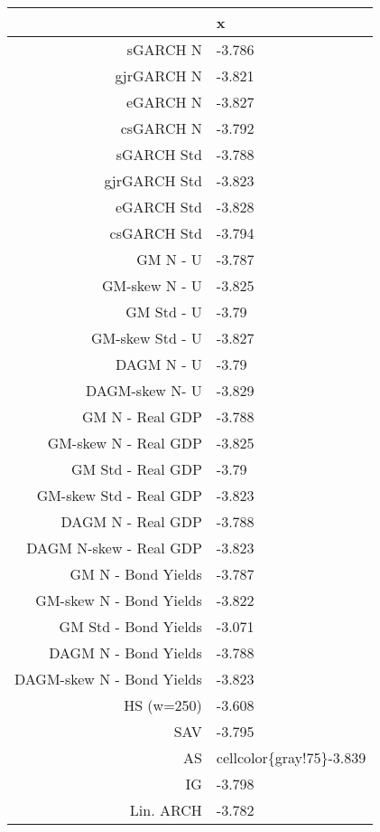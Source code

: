 \documentclass{article}
\begin{document}


\begin{table}[ht]
\centering
\begin{tabular}{rl}
  \hline
 & x \\ 
  \hline
sGARCH N & -3.786 \\ 
  gjrGARCH N & -3.821 \\ 
  eGARCH N & -3.827 \\ 
  csGARCH N & -3.792 \\ 
  sGARCH Std & -3.788 \\ 
  gjrGARCH Std & -3.823 \\ 
  eGARCH Std & -3.828 \\ 
  csGARCH Std & -3.794 \\ 
  GM N - U & -3.787 \\ 
  GM-skew N - U & -3.825 \\ 
  GM Std - U & -3.79 \\ 
  GM-skew Std - U & -3.827 \\ 
  DAGM N - U & -3.79 \\ 
  DAGM-skew  N- U & -3.829 \\ 
  GM N - Real GDP & -3.788 \\ 
  GM-skew N - Real GDP & -3.825 \\ 
  GM Std - Real GDP & -3.79 \\ 
  GM-skew Std - Real GDP & -3.823 \\ 
  DAGM N - Real GDP & -3.788 \\ 
  DAGM N-skew - Real GDP & -3.823 \\ 
  GM N - Bond Yields & -3.787 \\ 
  GM-skew N - Bond Yields & -3.822 \\ 
  GM Std - Bond Yields & -3.071 \\ 
  DAGM N - Bond Yields & -3.788 \\ 
  DAGM-skew N - Bond Yields & -3.823 \\ 
  HS (w=250) & -3.608 \\ 
  SAV & -3.795 \\ 
  AS & cellcolor\{gray!75\}-3.839 \\ 
  IG & -3.798 \\ 
  Lin. ARCH & -3.782 \\ 
   \hline
\end{tabular}
\end{table}
\end{document}
